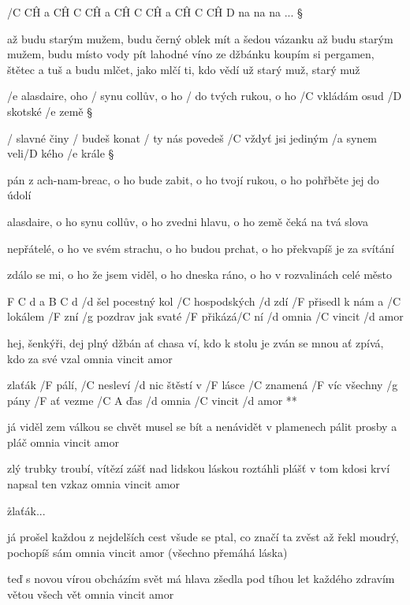 /{C  C\^H a C\^H C C\^H a C\^H C C\^H a C\^H C C\^H D} na na na ... \S

až budu starým mužem, budu černý oblek mít
a šedou vázanku
až budu starým mužem, budu místo vody pít
lahodné víno ze džbánku
koupím si pergamen, štětec a tuš
a budu mlčet, jako mlčí ti, kdo vědí už
starý muž, starý muž

   


/e alasdaire, oho
/ synu collův, o ho
/ do tvých rukou, o ho
/C vkládám osud /D skotské /e země \S

/ slavné činy
/ budeš konat
/ ty nás povedeš
/C vždyť jsi jediným /a synem veli/D kého /e krále \S

pán z ach-nam-breac, o ho
bude zabit, o ho
tvojí rukou, o ho
pohřběte jej do údolí \s

alasdaire, o ho
synu collův, o ho
zvedni hlavu, o ho
země čeká na tvá slova \s

nepřátelé, o ho
ve svém strachu, o ho
budou prchat, o ho
překvapíš je za svítání \s

zdálo se mi, o ho
že jsem viděl, o ho
dneska ráno, o ho
v rozvalinách celé město




F C d a B C d 
/d šel pocestný kol /C hospodských /d zdí
/F přisedl k nám a /C lokálem /F zní
/g pozdrav jak svaté /F přikázá/C ní
/d omnia /C vincit /d amor \s

hej, šenkýři, dej plný džbán
ať chasa ví, kdo k stolu je zván
se mnou ať zpívá, kdo za své vzal
omnia vincit amor \s

\R zlaťák /F pálí, /C nesleví /d nic
   štěstí v /F lásce /C znamená /F víc
   všechny /g pány /F ať vezme /{C A} ďas
   /d omnia /C vincit /d amor **

já viděl zem válkou se chvět
musel se bít a nenávidět
v plamenech pálit prosby a pláč
omnia vincit amor \s

zlý trubky troubí, vítězí zášť
nad lidskou láskou roztáhli plášť
v tom kdosi krví napsal ten vzkaz
omnia vincit amor \s

\r zlaťák...

já prošel každou z nejdelších cest
všude se ptal, co značí ta zvěst
až řekl moudrý, pochopíš sám
omnia vincit amor (všechno přemáhá láska) \s

\rr

teď s novou vírou obcházím svět
má hlava zšedla pod tíhou let
každého zdravím větou všech vět
omnia vincit amor



